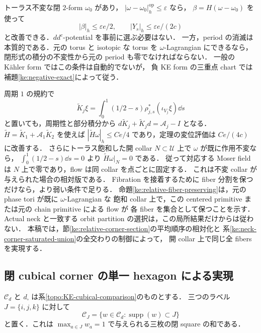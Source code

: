 \begin{remark}
\label{ke:averaging-refinement}
トーラス不変な閉 $2$-form $\omega_0$ があり，
$|\omega-\omega_0|_h^{\mathrm{op}}\le\varepsilon$ なら，
$\beta=H(\omega-\omega_0)$ を使って
\[
 |\beta|_h\le\varepsilon e/2,\qquad
 |Y_s|_h\le\varepsilon e/(2c)
\]
と改善できる．$dd^c$-potential を事前に選ぶ必要はない．
一方，period の消滅は本質的である．元の torus と isotopic な torus を
$\omega$-Lagrangian にできるなら，閉形式の積分の不変性から元の period も零でなければならない．
一般の Kähler form ではこの条件は自動的でないが，
負 KE form の三重点 chart では補題\ref{ke:negative-exact}によって従う．
\end{remark}

\begin{remark}
\label{ke:relative-averaging}
周期 $1$ の規約で
\[
 \widetilde K_j\xi
 =\int_0^1(1/2-s)\rho_{j,s}^*(\iota_{V_j}\xi)\dd s
\]
と置いても，周期性と部分積分から
$d\widetilde K_j+\widetilde K_jd=\mathcal A_j-I$ となる．
$\widetilde H=\widetilde K_1+\mathcal A_1\widetilde K_2$ を使えば
$|\widetilde H\omega|_h\le Ce/4$ であり，定理の変位評価は $Ce/(4c)$ に改善する．
さらにトーラス飽和した開 collar $N\subset\mathcal U$ 上で $\omega$ が既に作用不変なら，
$\int_0^1(1/2-s)\dd s=0$ より $\widetilde H\omega|_N=0$ である．
従って対応する Moser field は $N$ 上で零であり，flow は同 collar を点ごとに固定する．
これは不変 collar が与えられた場合の相対版である．
Fibration を接着するために fiber 分割を保つだけなら，より弱い条件で足りる．
命題\ref{ke:relative-fiber-preserving}は，元の phase tori が既に $\omega$-Lagrangian な
飽和 collar 上で，この centered primitive または元の chain primitive による flow が
各 fiber を集合として保つことを示す．
Actual neck と一致する orbit partition の選択は，この局所結果だけからは従わない．
本稿では，節\ref{ke:relative-corner-section}の平均順序の相対化と
系\ref{ke:neck-corner-saturated-union}の全交わりの制御によって，
開 collar 上で同じ全 fibers を実現する．
\end{remark}

\subsection{閉 cubical corner の単一 hexagon による実現}

$\mathcal C_d$ と $d_\square$ は系\ref{topo:KE-cubical-comparison}のものとする．
三つのラベル $J=\{i,j,k\}$ に対して
\[
 \mathcal C_J=
 \{w\in\mathcal C_d:\operatorname{supp}(w)\subset J\}
\]
と置く．これは $\max_{a\in J}w_a=1$ で与えられる三枚の閉 square の和である．

